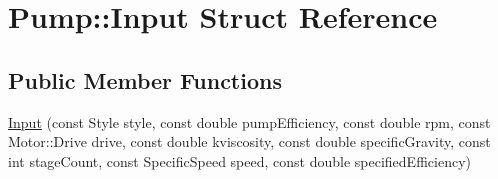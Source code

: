 \hypertarget{struct_pump_1_1_input}{}\section{Pump\+:\+:Input Struct Reference}
\label{struct_pump_1_1_input}
\subsection*{Public Member Functions}
\begin{DoxyCompactItemize}
\item 
\hyperlink{struct_pump_1_1_input_a71e2e30fbb9355f39f63f171ac5fac9e}{Input} (const Style style, const double pump\+Efficiency, const double rpm, const Motor\+::\+Drive drive, const double kviscosity, const double specific\+Gravity, const int stage\+Count, const Specific\+Speed speed, const double specified\+Efficiency)
\end{DoxyCompactItemize}

